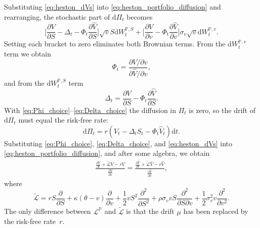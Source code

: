 \documentclass[12pt]{report} %
\theoremstyle{plain}           %
\theoremstyle{definition}      %
\theoremstyle{remark}          %
\begin{document}
Substituting \eqref{eq:heston_dVs} into \eqref{eq:heston_portfolio_diffusion} and rearranging,
the stochastic part of $\mathrm d\Pi_t$ becomes
\[
\bigl[\frac{\partial V}{\partial S}-\Delta_t-\Phi_t \frac{\partial \widehat V}{\partial S}\bigr]\sqrt{v}S\mathrm dW_t^{\mathbb P,S}
+
\bigl[\frac{\partial V}{\partial v}-\Phi_t \frac{\partial \widehat V}{\partial v}\bigr]\sigma_v\sqrt{v}\mathrm dW_t^{\mathbb P,v}.
\]
Setting each bracket to zero eliminates both Brownian terms. From the $\mathrm dW_t^{\mathbb P,v}$
term we obtain
\begin{equation}\label{eq:Phi_choice}
\Phi_t = \frac{\partial V/\partial v}{\partial \widehat V/\partial v},
\end{equation}
and from the $\mathrm dW_t^{\mathbb P,S}$ term
\begin{equation}\label{eq:Delta_choice}
\Delta_t = \frac{\partial V}{\partial S} - \Phi_t \frac{\partial \widehat V}{\partial S}.
\end{equation}
With \eqref{eq:Phi_choice}--\eqref{eq:Delta_choice} the diffusion in $\Pi_t$ is zero, so the drift
of $\mathrm d\Pi_t$ must equal the risk-free rate:
\begin{equation}\label{eq:heston_riskfree_portfolio}
	\mathrm d\Pi_t = r(V_t - \Delta_t S_t - \Phi_t \widehat V_t )\mathrm d t.
\end{equation}
Substituting \eqref{eq:Phi_choice}, \eqref{eq:Delta_choice}, and \eqref{eq:heston_dVs} into
\eqref{eq:heston_portfolio_diffusion}, and after some algebra, we obtain
\begin{equation}\label{eq:market_price_vol}
\begin{aligned}
  \frac{\frac{\partial V}{\partial t} + \tilde{\mathcal L} V - rV }{\frac{\partial V}{ \partial v}}
  = \frac{\frac{\partial \widehat V}{\partial t} + \tilde{\mathcal L} \widehat V - r \widehat V}{\frac{\partial \widehat V}{\partial v}},
\end{aligned}
\end{equation}
where
\[
\tilde{\mathcal L} = r S\frac{\partial}{\partial S}
    + \kappa(\theta - v)\frac{\partial}{\partial v}
    + \frac{1}{2} v S^{2}\frac{\partial^{2}}{\partial S^{2}}
    + \rho\sigma_v v S\frac{\partial^{2}}{\partial S\partial v}
    + \frac{1}{2}\sigma_v^{2} v \frac{\partial^{2}}{\partial v^{2}}.
\]
The only difference between $\mathcal L^{\mathbb P}$ and $\tilde{\mathcal L}$ is that the drift
$\mu$ has been replaced by the risk-free rate~$r$.
\end{document}
